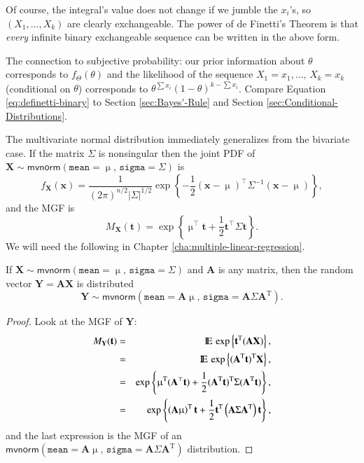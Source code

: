 \documentclass[captions=tableheading]{scrbook}
\begin{document}
Of course, the integral's value does not change if we jumble the \(x_{i}\)'s, so \((X_{1},\ldots,X_{k})\) are clearly exchangeable. The power of de Finetti's Theorem is that \emph{every} infinite binary exchangeable sequence can be written in the above form.

The connection to subjective probability: our prior information about \(\theta\) corresponds to \(f_{\Theta}(\theta)\) and the likelihood of the sequence \(X_{1}=x_{1},\ldots,\, X_{k}=x_{k}\) (conditional on \(\theta\)) corresponds to \(\theta^{\sum x_{i}}(1-\theta)^{k-\sum x_{i}}\). Compare Equation \ref{eq:definetti-binary} to Section \ref{sec:Bayes'-Rule} and Section \ref{sec:Conditional-Distributions}.

The multivariate normal distribution immediately generalizes from the bivariate case. If the matrix \(\Sigma\) is nonsingular then the joint PDF of \(\mathbf{X}\sim\mathsf{mvnorm}(\mathtt{mean}=\upmu,\,\mathtt{sigma}=\Sigma)\) is
\begin{equation}
f_{\mathbf{X}}(\mathbf{x})=\frac{1}{(2\pi)^{n/2}\left|\Sigma\right|^{1/2}}\exp\left\{ -\frac{1}{2}\left(\mathbf{x}-\upmu\right)^{\top}\Sigma^{-1}\left(\mathbf{x}-\upmu\right)\right\},
\end{equation}
and the MGF is
\begin{equation}
M_{\mathbf{X}}(\mathbf{t})=\exp\left\{ \upmu^{\top}\mathbf{t}+\frac{1}{2}\mathbf{t}^{\top}\Sigma\mathbf{t}\right\}.
\end{equation}
We will need the following in Chapter \ref{cha:multiple-linear-regression}.

\begin{thm}
\label{thm:mvnorm-dist-matrix-prod}
If \(\mathbf{X}\sim\mathsf{mvnorm}(\mathtt{mean}=\upmu,\,\mathtt{sigma}=\Sigma)\) and \(\mathbf{A}\) is any matrix, then the random vector \(\mathbf{Y}=\mathbf{AX}\)
is distributed
\begin{equation}
\mathbf{Y}\sim\mathsf{mvnorm}(\mathtt{mean}=\mathbf{A}\upmu,\,\mathtt{sigma}=\mathbf{A}\Sigma\mathbf{A}^{\mathrm{T}}).
\end{equation}
\end{thm}

\begin{proof}
Look at the MGF of \(\mathbf{Y}\):
\begin{eqnarray*}
M_{\mathbf{Y}}(\mathbf{t}) & = & \mathrm{I\hspace{-1.5pt}E}\,\exp\left\{ \mathbf{t}^{\mathrm{T}}(\mathbf{AX})\right\} ,\\
 & = & \mathrm{I\hspace{-1.5pt}E}\,\exp\left\{ (\mathbf{A}^{\mathrm{T}}\mathbf{t})^{\mathrm{T}}\mathbf{X}\right\} ,\\
 & = & \exp\left\{ \upmu^{\mathrm{T}}(\mathbf{A}^{\top}\mathbf{t})+\frac{1}{2}(\mathbf{A}^{\mathrm{T}}\mathbf{t})^{\mathrm{T}}\Sigma(\mathbf{A}^{\mathrm{T}}\mathbf{t})\right\} ,\\
 & = & \exp\left\{ \left(\mathbf{A}\upmu\right)^{\mathrm{T}}\mathbf{t}+\frac{1}{2}\mathbf{t}^{\mathrm{T}}\left(\mathbf{A}\Sigma\mathbf{A}^{\mathrm{T}}\right)\mathbf{t}\right\},
\end{eqnarray*}
and the last expression is the MGF of an \(\mathsf{mvnorm}(\mathtt{mean}=\mathbf{A}\upmu,\,\mathtt{sigma}=\mathbf{A}\Sigma\mathbf{A}^{\mathrm{T}})\) distribution.
\end{proof}
\end{document}
